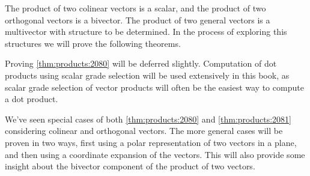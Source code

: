 %
%
The product of two colinear vectors is a scalar, and the product of two orthogonal vectors is a bivector.
The product of two general vectors is a multivector with structure to be determined.  In the process of exploring this structures we will prove the following theorems.

\index{\(\Ba \cdot \Bb\)}
Proving \cref{thm:products:2080} will be deferred slightly.
Computation of dot products using scalar grade selection will be used extensively in this book, as scalar
grade selection of vector products will often be the easiest way to compute a dot product.


We've seen special cases of both
\cref{thm:products:2080}
and
\cref{thm:products:2081}
considering colinear and orthogonal vectors.
The more general cases will be proven in two ways, first using a polar representation of two vectors in a plane, and then using a coordinate expansion of the vectors.  This will also provide some insight about the bivector component of the product of two vectors.


